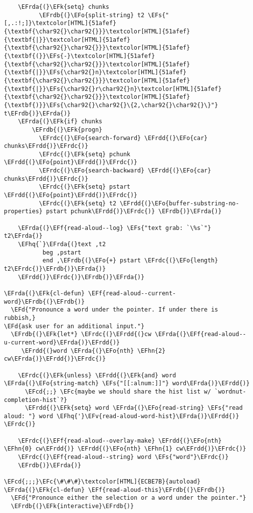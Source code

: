 \documentclass[a4wide,10pt]{article}
\newcommand{\EFc}[1]{\textcolor{EFc}{#1}} %
\newcommand{\EFcd}[1]{\textcolor{EFcd}{#1}} %
\newcommand{\EFs}[1]{\textcolor{EFs}{#1}} %
\newcommand{\EFd}[1]{\textcolor{EFd}{#1}} %
\newcommand{\EFk}[1]{\textcolor{EFk}{#1}} %
\newcommand{\EFf}[1]{\textcolor{EFf}{#1}} %
\newcommand{\EFv}[1]{\textcolor{EFv}{#1}} %
\newcommand{\EFo}[1]{\textcolor{EFo}{#1}} %
\newcommand{\EFhn}[1]{\textcolor{EFhn}{\textbf{#1}}} %
\newcommand{\EFhq}[1]{\textcolor{EFhq}{#1}} %
\newcommand{\EFrda}[1]{\textcolor{EFrda}{#1}} %
\newcommand{\EFrdb}[1]{\textcolor{EFrdb}{#1}} %
\newcommand{\EFrdc}[1]{\textcolor{EFrdc}{#1}} %
\newcommand{\EFrdd}[1]{\textcolor{EFrdd}{#1}} %
\begin{document}
\begin{Code}
\begin{Verbatim}
	\EFrda{(}\EFk{setq} chunks
	      \EFrdb{(}\EFo{split-string} t2 \EFs{"[,.:!;]}\textcolor[HTML]{51afef}{\textbf{\char92{}\char92{}}}\textcolor[HTML]{51afef}{\textbf{|}}\textcolor[HTML]{51afef}{\textbf{\char92{}\char92{}}}\textcolor[HTML]{51afef}{\textbf{(}}\EFs{-}\textcolor[HTML]{51afef}{\textbf{\char92{}\char92{}}}\textcolor[HTML]{51afef}{\textbf{|}}\EFs{\char92{}n}\textcolor[HTML]{51afef}{\textbf{\char92{}\char92{}}}\textcolor[HTML]{51afef}{\textbf{|}}\EFs{\char92{}r\char92{}n}\textcolor[HTML]{51afef}{\textbf{\char92{}\char92{}}}\textcolor[HTML]{51afef}{\textbf{)}}\EFs{\char92{}\char92{}\{2,\char92{}\char92{}\}"} t\EFrdb{)}\EFrda{)}
	\EFrda{(}\EFk{if} chunks
	    \EFrdb{(}\EFk{progn}
	      \EFrdc{(}\EFo{search-forward} \EFrdd{(}\EFo{car} chunks\EFrdd{)}\EFrdc{)}
	      \EFrdc{(}\EFk{setq} pchunk \EFrdd{(}\EFo{point}\EFrdd{)}\EFrdc{)}
	      \EFrdc{(}\EFo{search-backward} \EFrdd{(}\EFo{car} chunks\EFrdd{)}\EFrdc{)}
	      \EFrdc{(}\EFk{setq} pstart \EFrdd{(}\EFo{point}\EFrdd{)}\EFrdc{)}
	      \EFrdc{(}\EFk{setq} t2 \EFrdd{(}\EFo{buffer-substring-no-properties} pstart pchunk\EFrdd{)}\EFrdc{)} \EFrdb{)}\EFrda{)}

	\EFrda{(}\EFf{read-aloud--log} \EFs{"text grab: `\%s`"} t2\EFrda{)}
	\EFhq{`}\EFrda{(}text ,t2
	       beg ,pstart
	       end ,\EFrdb{(}\EFo{+} pstart \EFrdc{(}\EFo{length} t2\EFrdc{)}\EFrdb{)}\EFrda{)}
	\EFrdd{)}\EFrdc{)}\EFrdb{)}\EFrda{)}

\EFrda{(}\EFk{cl-defun} \EFf{read-aloud--current-word}\EFrdb{(}\EFrdb{)}
  \EFd{"Pronounce a word under the pointer. If under there is rubbish,}
\EFd{ask user for an additional input."}
  \EFrdb{(}\EFk{let*} \EFrdc{(}\EFrdd{(}cw \EFrda{(}\EFf{read-aloud--u-current-word}\EFrda{)}\EFrdd{)}
	 \EFrdd{(}word \EFrda{(}\EFo{nth} \EFhn{2} cw\EFrda{)}\EFrdd{)}\EFrdc{)}

    \EFrdc{(}\EFk{unless} \EFrdd{(}\EFk{and} word \EFrda{(}\EFo{string-match} \EFs{"[[:alnum:]]"} word\EFrda{)}\EFrdd{)}
      \EFcd{;;} \EFc{maybe we should share the hist list w/ `wordnut-completion-hist`?}
      \EFrdd{(}\EFk{setq} word \EFrda{(}\EFo{read-string} \EFs{"read aloud: "} word \EFhq{'}\EFv{read-aloud-word-hist}\EFrda{)}\EFrdd{)} \EFrdc{)}

    \EFrdc{(}\EFf{read-aloud--overlay-make} \EFrdd{(}\EFo{nth} \EFhn{0} cw\EFrdd{)} \EFrdd{(}\EFo{nth} \EFhn{1} cw\EFrdd{)}\EFrdc{)}
    \EFrdc{(}\EFf{read-aloud--string} word \EFs{"word"}\EFrdc{)}
    \EFrdb{)}\EFrda{)}

\EFcd{;;;}\EFc{\#\#\#}\textcolor[HTML]{ECBE7B}{autoload}
\EFrda{(}\EFk{cl-defun} \EFf{read-aloud-this}\EFrdb{(}\EFrdb{)}
  \EFd{"Pronounce either the selection or a word under the pointer."}
  \EFrdb{(}\EFk{interactive}\EFrdb{)}


\end{Verbatim}
\end{Code}
\end{document}
